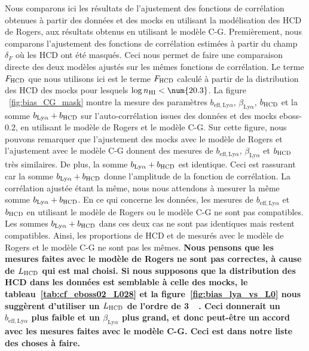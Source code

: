 Nous comparons ici les résultats de l'ajustement des fonctions de corrélation obtenues à partir des données et des mocks en utilisant la modélisation des HCD de Rogers, aux résultats obtenus en utilisant le modèle C-G.
Premièrement, nous comparons l'ajustement des fonctions de corrélation estimées à partir du champ $\delta_F$ où les HCD ont été masqués. Ceci nous permet de faire une comparaison directe des deux modèles ajustés sur les mêmes fonctions de corrélation.
Le terme $F_{\textsc{HCD}}$ que nous utilisons ici est le terme $F_{\textsc{HCD}}$ calculé à partir de la distribution des HCD des mocks pour lesquels $\log n_{\textsc{HI}} < \num{20.3}$.
La figure ~\ref{fig:bias_CG_mask} montre la mesure des paramètres $b_{\mathrm{eff},\mathrm{Ly}\alpha}$, $\beta_{\mathrm{Ly}\alpha}$, $b_{\textsc{HCD}}$ et la somme  $b_{\mathrm{Ly}\alpha} + b_{\textsc{HCD}}$ sur l'auto-corrélation issues des données et des mocks eboss-0.2, en utilisant le modèle de Rogers et le modèle C-G.
Sur cette figure, nous pouvons remarquer que l'ajustement des mocks avec le modèle de Rogers et l'ajustement avec le modèle C-G donnent des mesures de $b_{\mathrm{eff},\mathrm{Ly}\alpha}$, $\beta_{\mathrm{Ly}\alpha}$ et $b_{\textsc{HCD}}$ très similaires. De plus, la somme  $b_{\mathrm{Ly}\alpha} + b_{\textsc{HCD}}$ est identique.
Ceci est rassurant car la somme $b_{\mathrm{Ly}\alpha} + b_{\textsc{HCD}}$ donne l'amplitude de la fonction de corrélation. La corrélation ajustée étant la même, nous nous attendons à mesurer la même somme $b_{\mathrm{Ly}\alpha} + b_{\textsc{HCD}}$.
En ce qui concerne les données, les mesures de $b_{\mathrm{eff},\mathrm{Ly}\alpha}$ et $b_{\textsc{HCD}}$ en utilisant le modèle de Rogers ou le modèle C-G ne sont pas compatibles. Les sommes  $b_{\mathrm{Ly}\alpha} + b_{\textsc{HCD}}$ dans ces deux cas ne sont pas identiques mais restent compatibles.
Ainsi, les proportions de HCD et de \lya{} mesurés avec le modèle de Rogers et le modèle C-G ne sont pas les mêmes.
\textbf{Nous pensons que les mesures faites avec le modèle de Rogers ne sont pas correctes, à cause de $L_{\textsc{HCD}}$ qui est mal choisi. Si nous supposons que la distribution des HCD dans les données est semblable à celle des mocks, le tableau~\ref{tab:cf_eboss02_L028} et la figure~\ref{fig:bias_lya_vs_L0} nous suggèrent d'utiliser un $L_{\textsc{HCD}}$ de l'ordre de \SI{3}{\perh\Mpc}. Ceci donnerait un $b_{\mathrm{eff},\mathrm{Ly}\alpha}$ plus faible et un $\beta_{\mathrm{Ly}\alpha}$ plus grand, et donc peut-être un accord avec les mesures faites avec le modèle C-G. Ceci est dans notre liste des choses à faire.}

